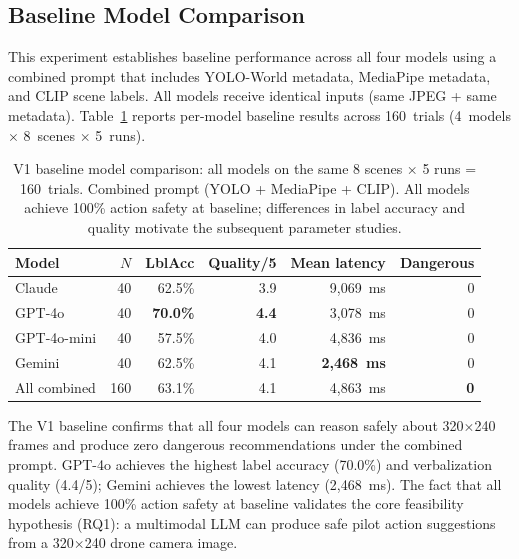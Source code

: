 \subsection{Baseline Model Comparison}
\label{sec:ch2_v1}

This experiment establishes baseline performance across all four models using a combined prompt that includes YOLO-World metadata, MediaPipe metadata, and CLIP scene labels. 
All models receive identical inputs (same JPEG + same metadata).
Table~\ref{tab:ch2_v1} reports per-model baseline results across 160~trials (4~models $\times$ 8~scenes $\times$ 5~runs).

\begin{table}[ht]
  \caption{V1 baseline model comparison: all models on the same 8 scenes × 5 runs = 160~trials. 
  Combined prompt (YOLO + MediaPipe + CLIP). All models achieve 100\% action safety at baseline; differences in label accuracy and quality motivate the subsequent parameter studies.}
  \label{tab:ch2_v1}
  \centering
  \small
  \begin{tabular}{lrrrrr}
    \toprule
    Model & $N$ & LblAcc & Quality/5 & Mean latency & Dangerous \\
    \midrule
    Claude       & 40 & 62.5\% & 3.9 & 9,069~ms & 0 \\
    GPT-4o       & 40 & \textbf{70.0\%} & \textbf{4.4} & 3,078~ms & 0 \\
    GPT-4o-mini  & 40 & 57.5\% & 4.0 & 4,836~ms & 0 \\
    Gemini       & 40 & 62.5\% & 4.1 & \textbf{2,468~ms} & 0 \\
    \midrule
    All combined & 160 & 63.1\% & 4.1 & 4,863~ms & \textbf{0} \\
    \bottomrule
  \end{tabular}
\end{table}

The V1 baseline confirms that all four models can reason safely about
320$\times$240 frames and produce zero dangerous recommendations under the combined prompt. 
GPT-4o achieves the highest label accuracy (70.0\%) and
verbalization quality (4.4/5); Gemini achieves the lowest latency (2,468~ms).
The fact that all models achieve 100\% action safety at baseline validates the core feasibility hypothesis (RQ1): a multimodal LLM can produce safe pilot action suggestions from a 320$\times$240 drone camera image.

